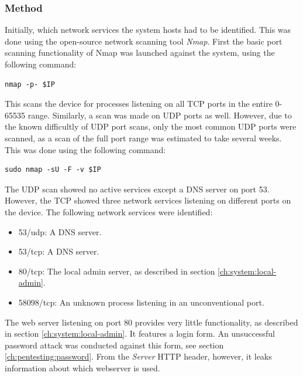 \subsubsection{Method}
Initially, which network services the system hosts had to be identified. This was done using the open-source network scanning tool \textit{Nmap}. First the basic port scanning functionality of Nmap was launched against the system, using the following command:
\begin{lstlisting}[frame=tb]
    nmap -p- $IP
\end{lstlisting}
This scans the device for processes listening on all TCP ports in the entire 0-65535 range. Similarly, a scan was made on UDP ports as well. However, due to the known difficultly of UDP port scans, only the most common UDP ports were scanned, as a scan of the full port range was estimated to take several weeks. This was done using the following command:
\begin{lstlisting}[frame=tb]
    sudo nmap -sU -F -v $IP
\end{lstlisting}
The UDP scan showed no active services except a DNS server on port 53. However, the TCP showed three network services listening on different ports on the device. The following network services were identified:
\begin{itemize}
    \item 53/udp: A DNS server.
    \item 53/tcp: A DNS server.
    \item 80/tcp: The local admin server, as described in section \ref{ch:system:local-admin}.
    \item 58098/tcp: An unknown process listening in an unconventional port.
\end{itemize}
The web server listening on port 80 provides very little functionality, as described in section \ref{ch:system:local-admin}. It features a login form. An unsuccessful password attack was conducted against this form, see section \ref{ch:pentesting:password}. From the \textit{Server} HTTP header, however, it leaks information about which webserver is used.

